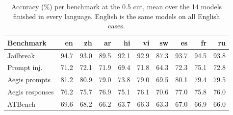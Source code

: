 \begin{table}[t]
\centering
\caption{Accuracy (\%) per benchmark at the 0.5 cut, mean over the 14 models finished in every language. English is the same models on all English cases.}
\label{tab:bench}
\small
\setlength{\tabcolsep}{4pt}
\begin{tabular}{@{}lrrrrrrrrr@{}}
\toprule
Benchmark & en & zh & ar & hi & vi & sw & es & fr & ru \\
\midrule
Jailbreak & 94.7 & 93.0 & 89.5 & 92.1 & 92.9 & 87.3 & 93.7 & 94.5 & 93.8 \\
Prompt inj. & 71.2 & 72.1 & 71.9 & 69.4 & 71.8 & 64.3 & 72.3 & 75.1 & 72.8 \\
Aegis prompts & 81.2 & 80.9 & 79.0 & 73.8 & 79.0 & 69.5 & 80.1 & 79.4 & 79.5 \\
Aegis responses & 76.2 & 75.7 & 76.9 & 75.1 & 76.1 & 70.6 & 77.0 & 75.8 & 76.0 \\
ATBench & 69.6 & 68.2 & 66.2 & 63.7 & 66.3 & 63.3 & 67.0 & 66.9 & 66.0 \\
\bottomrule
\end{tabular}
\end{table}
